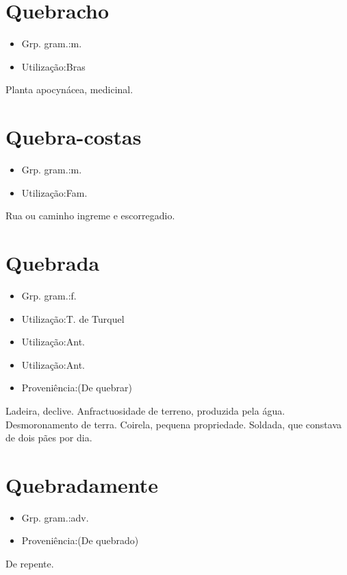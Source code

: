 \section{Quebracho}
\begin{itemize}
\item {Grp. gram.:m.}
\end{itemize}
\begin{itemize}
\item {Utilização:Bras}
\end{itemize}
Planta apocynácea, medicinal.
\section{Quebra-costas}
\begin{itemize}
\item {Grp. gram.:m.}
\end{itemize}
\begin{itemize}
\item {Utilização:Fam.}
\end{itemize}
Rua ou caminho ingreme e escorregadio.
\section{Quebrada}
\begin{itemize}
\item {Grp. gram.:f.}
\end{itemize}
\begin{itemize}
\item {Utilização:T. de Turquel}
\end{itemize}
\begin{itemize}
\item {Utilização:Ant.}
\end{itemize}
\begin{itemize}
\item {Utilização:Ant.}
\end{itemize}
\begin{itemize}
\item {Proveniência:(De \textunderscore quebrar\textunderscore )}
\end{itemize}
Ladeira, declive.
Anfractuosidade de terreno, produzida pela água.
Desmoronamento de terra.
Coirela, pequena propriedade.
Soldada, que constava de dois pães por dia.
\section{Quebradamente}
\begin{itemize}
\item {Grp. gram.:adv.}
\end{itemize}
\begin{itemize}
\item {Proveniência:(De \textunderscore quebrado\textunderscore )}
\end{itemize}
De repente.
